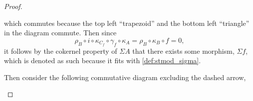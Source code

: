 \begin{proof}
\begin{enumerate}[label={(\bfseries TR\arabic*)}]
{\begin{center}
            \end{center}
            which commutes because the top left ``trapezoid'' and the bottom left ``triangle'' in the diagram commute. Then since
            \[
                \rho_B \circ i \circ \kappa_{C_f} \circ \gamma_f \circ \kappa_A = \rho_B \circ \kappa_B \circ f = 0,
            \]
            it follows by the cokernel property of \( \Sigma A \) that there exists some morphism, \( \Sigma f \), which is denoted as such because it fits with \autoref{def:stmod_sigma}.

            Then consider the following commutative diagram excluding the dashed arrow,
            \begin{center}
\end{center}}
\end{enumerate}
\end{proof}

